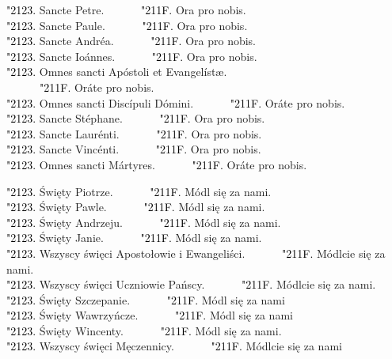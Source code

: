 \documentclass[10pt,a5paper]{book}
\newcommand{\kol}{black}
\newcommand{\textjuni}[1]{{\fontspec{Junicode-Regular}#1}}
\newcommand{\vv}{\textcolor{\kol}{\textjuni{\char"2123. }}}
\newcommand{\rrr}{\newline\textcolor{\kol}{\textjuni{~~~~~~\char"211F. }}}
\newcommand{\oremuss}[2]{
	\begin{sloppypar}
		\begin{paracol}{2}
			\setlength{\columnsep}{0em}
			\begin{leftcolumn}
				#1
			\end{leftcolumn}
			\begin{rightcolumn}
				#2
			\end{rightcolumn}
		\end{paracol}
	\end{sloppypar}}
\begin{document}
						\oremuss{
							\vv Sancte Petre. \rrr Ora pro nobis.\\
							\vv Sancte Paule. \rrr Ora pro nobis.\\
							\vv Sancte Andréa. \rrr Ora pro nobis.\\
							\vv Sancte Ioánnes. \rrr Ora pro nobis.\\
							\vv Omnes sancti Apóstoli et Evangelístæ. \\\rrr Oráte pro nobis.\\
							\vv Omnes sancti Discípuli Dómini. \rrr Oráte pro nobis.\\
							\vv Sancte Stéphane. \rrr Ora pro nobis.\\
							\vv Sancte Laurénti. \rrr Ora pro nobis.\\
							\vv Sancte Vincénti. \rrr Ora pro nobis.\\
							\vv Omnes sancti Mártyres. \rrr Oráte pro nobis.}{
							\vv Święty Piotrze. \rrr Módl się za nami.\\
							\vv Święty Pawle. \rrr Módl się za nami.\\
							\vv Święty Andrzeju. \rrr Módl się za nami.\\
							\vv Święty Janie. \rrr Módl się za nami.\\
							\vv Wszyscy święci Apostołowie i Ewangeliści. \rrr Módlcie się za nami.\\
							\vv Wszyscy święci Uczniowie Pańscy. \rrr Módlcie się za nami.\\
							\vv Święty Szczepanie. \rrr Módl się za nami\\
							\vv Święty Wawrzyńcze. \rrr Módl się za nami\\
							\vv Święty Wincenty. \rrr Módl się za nami.\\
							\vv Wszyscy święci Męczennicy. \rrr Módlcie się za nami}
\end{document}
